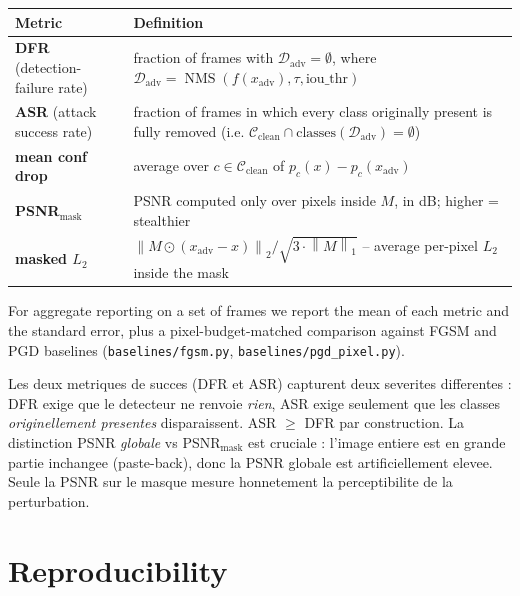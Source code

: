 \documentclass[11pt,a4paper]{article}
\newcommand{\norm}[1]{\left\lVert#1\right\rVert}
\DeclareMathOperator{\NMS}{NMS}
\begin{document}
\begin{center}
\small
\begin{tabular}{@{}lp{11cm}@{}}
\toprule
Metric & Definition \\
\midrule
\textbf{DFR} (detection-failure rate)
   & fraction of frames with $\mathcal{D}_{\text{adv}} = \emptyset$, where
     $\mathcal{D}_{\text{adv}} = \NMS(f(x_{\text{adv}}), \tau, \text{iou\_thr})$ \\
\textbf{ASR} (attack success rate)
   & fraction of frames in which every class originally present is fully
     removed (i.e. $\mathcal{C}_{\text{clean}} \cap \text{classes}(\mathcal{D}_{\text{adv}}) = \emptyset$) \\
\textbf{mean conf drop}
   & average over $c \in \mathcal{C}_{\text{clean}}$ of
     $p_c(x) - p_c(x_{\text{adv}})$ \\
\textbf{PSNR}$_{\text{mask}}$
   & PSNR computed only over pixels inside $M$, in dB; higher = stealthier \\
\textbf{masked $L_2$}
   & $\norm{M \odot (x_{\text{adv}} - x)}_2 / \sqrt{3 \cdot \norm{M}_1}$ -- average per-pixel $L_2$ inside the mask \\
\bottomrule
\end{tabular}
\end{center}

\noindent For aggregate reporting on a set of frames we report the mean of each metric
and the standard error, plus a pixel-budget-matched comparison against FGSM
and PGD baselines (\texttt{baselines/fgsm.py},
\texttt{baselines/pgd\_pixel.py}).

\begin{supervisornote}
Les deux metriques de succes (DFR et ASR) capturent deux severites
differentes : DFR exige que le detecteur ne renvoie \emph{rien}, ASR
exige seulement que les classes \emph{originellement presentes}
disparaissent. ASR $\geq$ DFR par construction. La distinction PSNR
\emph{globale} vs PSNR$_{\text{mask}}$ est cruciale : l'image entiere
est en grande partie inchangee (paste-back), donc la PSNR globale est
artificiellement elevee. Seule la PSNR sur le masque mesure honnetement
la perceptibilite de la perturbation.
\end{supervisornote}

\section{Reproducibility}\label{sec:repro}
\end{document}

